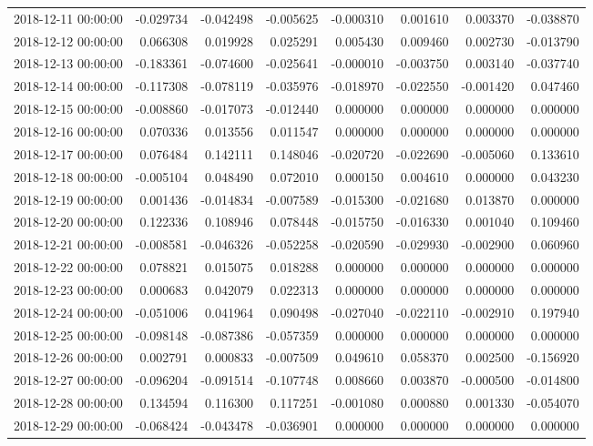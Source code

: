 \begin{tabular}{lrrrrrrr}
2018-12-11 00:00:00 & -0.029734 & -0.042498 & -0.005625 & -0.000310 & 0.001610 & 0.003370 & -0.038870 \\
2018-12-12 00:00:00 & 0.066308 & 0.019928 & 0.025291 & 0.005430 & 0.009460 & 0.002730 & -0.013790 \\
2018-12-13 00:00:00 & -0.183361 & -0.074600 & -0.025641 & -0.000010 & -0.003750 & 0.003140 & -0.037740 \\
2018-12-14 00:00:00 & -0.117308 & -0.078119 & -0.035976 & -0.018970 & -0.022550 & -0.001420 & 0.047460 \\
2018-12-15 00:00:00 & -0.008860 & -0.017073 & -0.012440 & 0.000000 & 0.000000 & 0.000000 & 0.000000 \\
2018-12-16 00:00:00 & 0.070336 & 0.013556 & 0.011547 & 0.000000 & 0.000000 & 0.000000 & 0.000000 \\
2018-12-17 00:00:00 & 0.076484 & 0.142111 & 0.148046 & -0.020720 & -0.022690 & -0.005060 & 0.133610 \\
2018-12-18 00:00:00 & -0.005104 & 0.048490 & 0.072010 & 0.000150 & 0.004610 & 0.000000 & 0.043230 \\
2018-12-19 00:00:00 & 0.001436 & -0.014834 & -0.007589 & -0.015300 & -0.021680 & 0.013870 & 0.000000 \\
2018-12-20 00:00:00 & 0.122336 & 0.108946 & 0.078448 & -0.015750 & -0.016330 & 0.001040 & 0.109460 \\
2018-12-21 00:00:00 & -0.008581 & -0.046326 & -0.052258 & -0.020590 & -0.029930 & -0.002900 & 0.060960 \\
2018-12-22 00:00:00 & 0.078821 & 0.015075 & 0.018288 & 0.000000 & 0.000000 & 0.000000 & 0.000000 \\
2018-12-23 00:00:00 & 0.000683 & 0.042079 & 0.022313 & 0.000000 & 0.000000 & 0.000000 & 0.000000 \\
2018-12-24 00:00:00 & -0.051006 & 0.041964 & 0.090498 & -0.027040 & -0.022110 & -0.002910 & 0.197940 \\
2018-12-25 00:00:00 & -0.098148 & -0.087386 & -0.057359 & 0.000000 & 0.000000 & 0.000000 & 0.000000 \\
2018-12-26 00:00:00 & 0.002791 & 0.000833 & -0.007509 & 0.049610 & 0.058370 & 0.002500 & -0.156920 \\
2018-12-27 00:00:00 & -0.096204 & -0.091514 & -0.107748 & 0.008660 & 0.003870 & -0.000500 & -0.014800 \\
2018-12-28 00:00:00 & 0.134594 & 0.116300 & 0.117251 & -0.001080 & 0.000880 & 0.001330 & -0.054070 \\
2018-12-29 00:00:00 & -0.068424 & -0.043478 & -0.036901 & 0.000000 & 0.000000 & 0.000000 & 0.000000 \\

\end{tabular}
